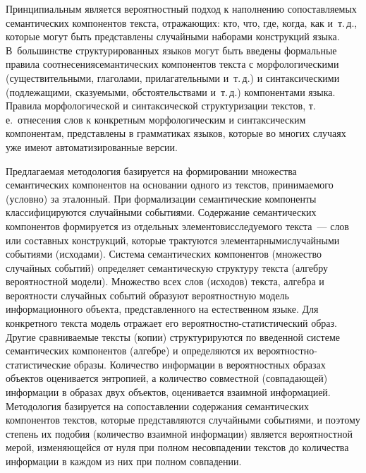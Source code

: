\begin{multicols}{2}
     Принципиальным является вероятностный подход к наполнению 
сопоставляемых семантических компонентов текста, отражающих: кто, что, где, 
когда, как и~т.\,д., которые могут быть пред\-став\-ле\-ны случайными наборами 
конструкций языка. В~большинстве структурированных языков могут быть введены 
формальные правила соотнесения\linebreak семантических компонентов текста с 
морфоло\-гическими (существительными, глаголами, при\-ла\-гательными и~т.\,д.) и 
синтаксическими (под\-ле\-жа\-щими, сказуемыми, обстоятельствами и~т.\,д.)\linebreak 
компонентами языка. Правила морфологической и синтаксической структуризации 
текстов, т.\,е.\ отнесения слов к конкретным морфологическим и синтаксическим 
компонентам, представлены в грамматиках языков, которые во многих случаях уже 
имеют автоматизированные версии.
     
     Предлагаемая методология базируется на формировании множества 
семантических компонентов на основании одного из текстов, принимаемого\linebreak 
(условно) за эталонный. При формализации семантические компоненты 
классифицируются случайными событиями. Содержание семантических 
компонентов формируется из отдельных элементов\linebreak исследуемого текста~--- слов 
или составных конструкций, которые трактуются элементарными\linebreak случайными 
событиями (исходами). Система семантических компонентов (множество случайных 
событий) определяет семантическую структуру текс\-та (алгебру вероятностной 
модели). Множество всех слов (исходов) текста, алгебра и вероятности случайных 
событий образуют вероятностную модель информационного объекта, 
представленного на естественном языке. Для конкретного текста модель отражает 
его ве\-ро\-ят\-ност\-но-ста\-ти\-сти\-че\-ский образ. Другие сравниваемые тексты 
(копии) структурируются по введенной системе семантических компонентов 
(алгебре) и определяются их ве\-ро\-ят\-ност\-но-ста\-ти\-сти\-че\-ские образы. 
Количество информации в вероятностных образах объектов оценивается энтропией, 
а количество совместной (совпада\-ющей) информации в образах двух объектов, 
оценивается взаимной информацией. Методология базируется на сопоставлении 
содержания семантических компонентов текстов, которые представляются 
случайными событиями, и поэтому степень их подобия (количество взаимной 
информации) является вероятностной мерой, изме\-ня\-ющей\-ся от нуля при полном 
несовпадении текстов до количества информации в каждом из них при полном 
совпадении. 
     

\end{multicols}
